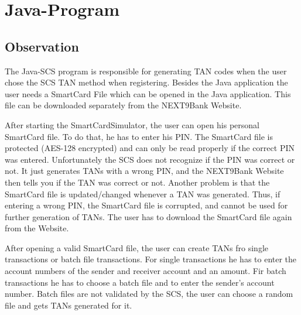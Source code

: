 \chapter{Java-Program}

\section{Observation}

The Java-SCS program is responsible for generating TAN codes when the user chose the SCS TAN method when registering. Besides the Java application the user needs a SmartCard File which can be opened in the Java application. This file can be downloaded separately from the NEXT9Bank Website.

After starting the SmartCardSimulator, the user can open his personal SmartCard file. To do that, he has to enter his PIN. The SmartCard file is protected (AES-128 encrypted) and can only be read properly if the correct PIN was entered. Unfortunately the SCS does not recognize if the PIN was correct or not. It just generates TANs with a wrong PIN, and the NEXT9Bank Website then tells you if the TAN was correct or not. Another problem is that the SmartCard file is updated/changed whenever a TAN was generated. Thus, if entering a wrong PIN, the SmartCard file is corrupted, and cannot be used for further generation of TANs. The user has to download the SmartCard file again from the Website.

After opening a valid SmartCard file, the user can create TANs fro single transactions or batch file transactions. For single transactions he has to enter the account numbers of the sender and receiver account and an amount. Fir batch transactions he has to choose a batch file and to enter the sender's account number. Batch files are not validated by the SCS, the user can choose a random file and gets TANs generated for it.